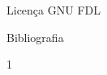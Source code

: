 \documentclass[svgnames]{beamer}
\begin{document}
\begin{frame}{Licença GNU FDL}
\end{frame}
\begin{frame}{Bibliografia}
\begin{thebibliography}{1}
\end{thebibliography}
\end{frame}
\end{document}
